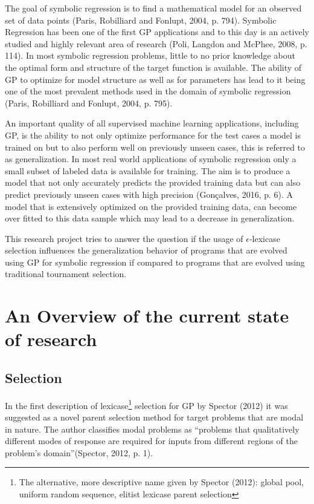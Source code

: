 \documentclass[
  12pt,
]{article}
\begin{document}
The goal of symbolic regression is to find a mathematical model for an
observed set of data points (Paris, Robilliard and Fonlupt, 2004, p.
794). Symbolic Regression has been one of the first GP applications and
to this day is an actively studied and highly relevant area of research
(Poli, Langdon and McPhee, 2008, p. 114). In most symbolic regression
problems, little to no prior knowledge about the optimal form and
structure of the target function is available. The ability of GP to
optimize for model structure as well as for parameters has lead to it
being one of the most prevalent methods used in the domain of symbolic
regression (Paris, Robilliard and Fonlupt, 2004, p. 795).

An important quality of all supervised machine learning applications,
including GP, is the ability to not only optimize performance for the
test cases a model is trained on but to also perform well on previously
unseen cases, this is referred to as generalization. In most real world
applications of symbolic regression only a small subset of labeled data
is available for training. The aim is to produce a model that not only
accurately predicts the provided training data but can also predict
previously unseen cases with high precision (Gonçalves, 2016, p. 6). A
model that is extensively optimized on the provided training data, can
become over fitted to this data sample which may lead to a decrease in
generalization.

This research project tries to answer the question if the usage of
\(\epsilon\)-lexicase selection influences the generalization behavior
of programs that are evolved using GP for symbolic regression if
compared to programs that are evolved using traditional tournament
selection.

\hypertarget{an-overview-of-the-current-state-of-research}{%
\section{An Overview of the current state of
research}\label{an-overview-of-the-current-state-of-research}}

\hypertarget{selection}{%
\subsection{Selection}\label{selection}}

In the first description of lexicase\footnote{The alternative, more
  descriptive name given by Spector (2012): global pool, uniform random
  sequence, elitist lexicase parent selection} selection for GP by
Spector (2012) it was suggested as a novel parent selection method for
target problems that are modal in nature. The author classifies modal
problems as ``problems that qualitatively different modes of response
are required for inputs from different regions of the problem's
domain''(Spector, 2012, p. 1).
\end{document}
